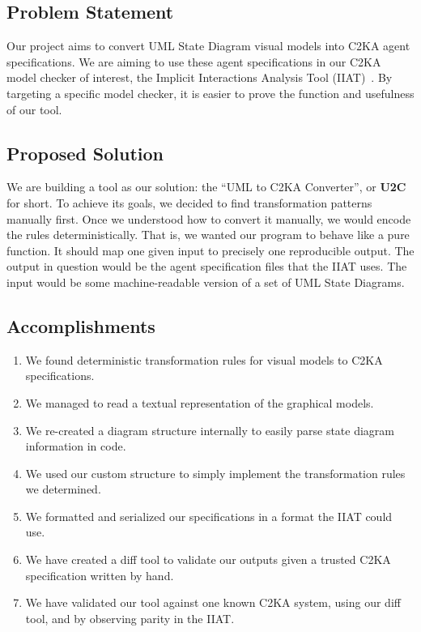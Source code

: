 \subsection{Problem Statement}\label{subsec:problem-statement}
Our project aims to convert UML State Diagram visual models into C2KA agent specifications.
We are aiming to use these agent specifications in our C2KA model checker of interest,
the Implicit Interactions Analysis Tool (IIAT)~\cite{repo_iiat}.
By targeting a specific model checker, it is easier to prove the function and usefulness of our tool.

\subsection{Proposed Solution}\label{subsec:proposed-solution}
We are building a tool as our solution: the ``UML to C2KA Converter'', or \textbf{U2C} for short.
To achieve its goals, we decided to find transformation patterns manually first.
Once we understood how to convert it manually, we would encode the rules deterministically.
That is, we wanted our program to behave like a pure function.
It should map one given input to precisely one reproducible output.
The output in question would be the agent specification files that the IIAT uses.
The input would be some machine-readable version of a set of UML State Diagrams.

\subsection{Accomplishments}\label{subsec:accomplishments}
\begin{enumerate}
    \item We found deterministic transformation rules for visual models
    to C2KA specifications.
    \item We managed to read a textual representation of the graphical models.
    \item We re-created a diagram structure internally to easily parse state diagram information in code.
    \item We used our custom structure to simply implement the transformation rules we determined.
    \item We formatted and serialized our specifications in a format the IIAT could use.
    \item We have created a diff tool to validate our outputs given a trusted C2KA specification written by hand.
    \item We have validated our tool against one known C2KA system,
    using our diff tool, and by observing parity in the IIAT\@.
\end{enumerate}

